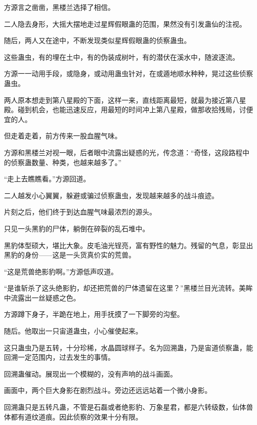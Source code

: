 
\begin{this_body}



方源言之凿凿，黑楼兰选择了相信。

二人隐去身形，大摇大摆地走过星辉假眼蛊的范围，果然没有引发蛊仙的注视。

随后，两人又在途中，不断发现类似星辉假眼蛊的侦察蛊虫。

这些蛊虫，有的埋在土中，有的伪装成树叶，有的潜伏在溪水中，随波逐流。

方源一一动用手段，或隐身，或动用蛊虫针对，在或遁地顺水种种，晃过这些侦察蛊虫。

两人原本想走到第八星殿的下面，这样一来，直线距离最短，就最为接近第八星殿。碰到机会，也能迅速反应，用最短的时间冲上第八星殿，做那收拾残局，讨便宜的人。

但走着走着，前方传来一股血腥气味。

方源和黑楼兰对视一眼，后者眼中流露出疑惑的光，传念道：“奇怪，这段路程中的侦察蛊数量、种类，也越来越多了。”

“走上去瞧瞧看。”方源回道。

二人越发小心翼翼，躲避或骗过侦察蛊虫，发现越来越多的战斗痕迹。

片刻之后，他们终于到达血腥气味最浓烈的源头。

只见一头黑豹的尸体，躺倒在碎裂的乱石堆中。

黑豹体型硕大，堪比大象。皮毛油光锃亮，富有野性的魅力。残留的气息，彰显出黑豹的身份——这是一头货真价实的荒兽。

“这是荒兽绝影豹啊。”方源低声叹道。

“是谁斩杀了这头绝影豹，却还把荒兽的尸体遗留在这里？”黑楼兰目光流转。美眸中流露出一丝疑惑之色。

方源蹲下身子，半跪在地上，用手抚摸了一下脚旁的沟壑。

随后。他取出一只宙道蛊虫，小心催使起来。

这只蛊虫乃是五转，十分珍稀，水晶圆球样子。名为回溯蛊，乃是宙道侦察蛊，能回溯一定范围内，过去发生的事情。

回溯蛊催动。展现出一个模糊的，没有声响的战斗画面。

画面中，两个巨大身影在剧烈战斗。旁边还远远站着一个微小身影。

回溯蛊只是五转凡蛊，不管是石磊或者绝影豹、万象星君，都是六转级数，仙体兽体都有道纹道痕。因此侦察的效果十分有限。


\end{this_body}

